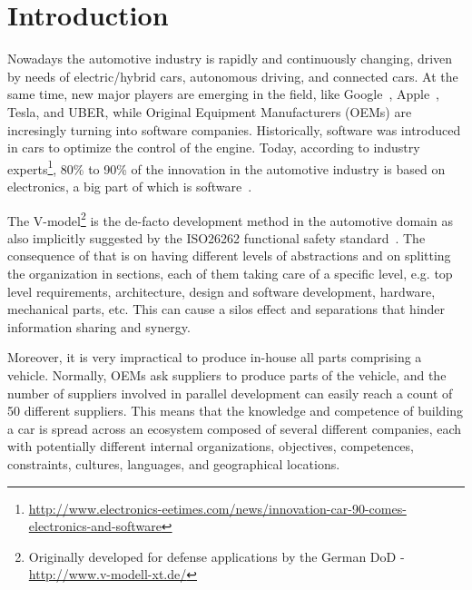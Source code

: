 \section{Introduction}\label{sec:intro}


Nowadays the automotive industry is rapidly and continuously changing, driven by needs of 
electric/hybrid cars, autonomous driving, and connected cars. At the same time, new major players are emerging in the field, like Google~\cite{Google}, Apple~\cite{Apple,Apple2}, Tesla, and UBER, while Original Equipment Manufacturers (OEMs) are incresingly turning into software companies. 
Historically, software was introduced in cars to optimize the control of the engine. 
Today, according to industry experts\footnote{\url{http://www.electronics-eetimes.com/news/innovation-car-90-comes-electronics-and-software}}, 80\% to 90\% of the innovation in the automotive industry is based on electronics, a big part of which is software~\cite{ESEM2016}. 

The V-model\footnote{Originally developed for defense applications by the German DoD - \url{http://www.v-modell-xt.de/}} is the de-facto development method in the automotive domain as also implicitly suggested by the ISO26262 functional safety standard~\cite{iso26262}. The consequence of that is on having 
different levels of abstractions and on splitting the organization in sections, each of them taking care of a specific level, e.g. top level requirements,
architecture, design and software development, hardware, mechanical parts, etc. 
This can cause a silos effect and separations that hinder information sharing and synergy.

Moreover, it is very impractical to produce in-house all parts comprising a vehicle. Normally, OEMs 
ask suppliers to produce parts of the vehicle, and the number of suppliers involved in parallel development can easily reach a count of 50 different suppliers. 
This means that the knowledge and competence of building a car is spread across an ecosystem composed of several different companies, each with potentially different internal organizations, objectives, competences, constraints, cultures, languages, and geographical locations. 

